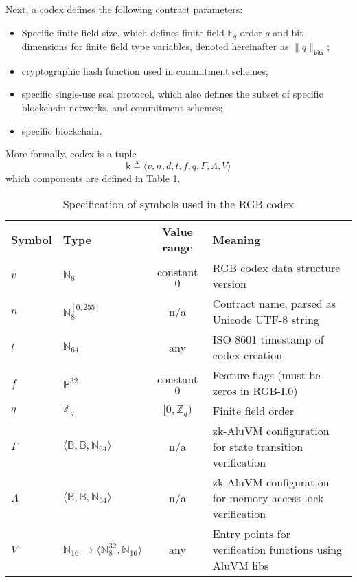 \documentclass[9pt,oneside]{amsart}
\begin{document}
\begin{multicols}{2}
Next, a codex defines the following contract parameters:

\begin{itemize}
\item Specific finite field size, which defines finite field $\mathbb{F}_q$ order $q$ and
  bit dimensions for finite field type variables, denoted hereinafter as $\|q\|_\mathsf{bits}$;
\item cryptographic hash function used in commitment schemes;
\item specific single-use seal protocol, which also defines the subset of specific blockchain networks,
  and commitment schemes;
\item specific blockchain.
\end{itemize}

More formally, codex is a tuple
\noindent
\begin{equation}
\mathsf{k} \triangleq \langle v, n, d, t, f, q, \mathsf{\Gamma}, \mathsf{\Lambda}, V \rangle
\end{equation}
\noindent
which components are defined in Table \ref{tab:codex}.

\end{multicols}
\begin{table}[h]
\centering
\caption{Specification of symbols used in the RGB codex}\label{tab:codex}
\begin{tabular}{ l l c p{8cm} }
\toprule
Symbol & Type & Value range & Meaning \\
\midrule
$v$ & $\mathbb{N}_8$ & constant $0$ & RGB codex data structure version \\
$n$ & $\mathbb{N}_8^{[0, 255]}$ & n/a & Contract name, parsed as Unicode UTF-8 string \\
$t$ & $\mathbb{N}_{64}$ & any & ISO 8601 timestamp of codex creation \\
$f$ & $\mathbb{B}^{32}$ & constant $0$ & Feature flags (must be zeros in RGB-I.0) \\
$q$ & $\mathbb{Z}_q$ & $[0, \mathbb{Z}_q)$ & Finite field order \\
$\mathsf{\Gamma}$ & $\langle \mathbb{B}, \mathbb{B}, \mathbb{N}_{64} \rangle$ & n/a &  zk-AluVM configuration for state transition verification \\
$\mathsf{\Lambda}$ & $\langle \mathbb{B}, \mathbb{B}, \mathbb{N}_{64} \rangle$ & n/a & zk-AluVM configuration for memory access lock verification \\
$V$ & $\mathbb{N}_{16} \rightarrow \langle \mathbb{N}_8^{32}, \mathbb{N}_{16} \rangle$ & any & Entry points for verification functions using AluVM libs \\
\bottomrule
\end{tabular}
\end{table}
\end{document}
